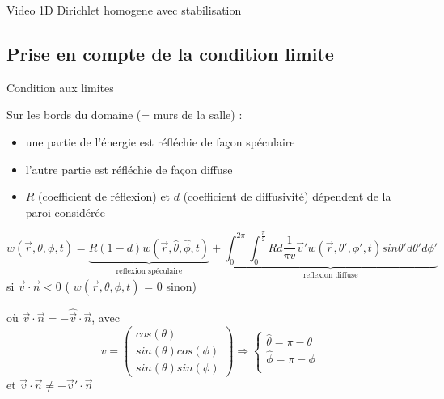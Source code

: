 \begin{frame}
  Video 1D Dirichlet homogene avec stabilisation
\end{frame}

\subsection{Prise en compte de la condition limite}
\begin{frame}{Condition aux limites}

  Sur les bords du domaine (= murs de la salle) :
  \begin{itemize}[label=$\bullet$]
  \item une partie de l'énergie est réfléchie de façon spéculaire %
  \item l'autre partie est réfléchie de façon diffuse %
    \vspace*{0.2cm}
  \item $R$ (coefficient de réflexion) et $d$ (coefficient de diffusivité) dépendent de la paroi considérée
  \end{itemize}

  \vspace*{-0.4cm}
  \begin{small}
    \begin{equation*}
      w(\vec{r},\theta,\phi,t) = \underbrace{R(1-d)w(\vec{r},\hat{\theta},\hat{\phi},t)}_{\text{reflexion spéculaire}}
      + \underbrace{ \int_{0}^{2\pi} \int_{0}^{\frac{\pi}{2}} Rd\frac{1}{\pi v} \vec{v}'w(\vec{r},\theta',\phi',t) sin \theta' d\theta' d\phi'}_{\text{reflexion diffuse}}
    \end{equation*}
    si $\vec{v} \cdot \vec{n} < 0$ ( $w(\vec{r},\theta,\phi,t)$ = 0 sinon) \\
  \end{small}

  où $\vec{v} \cdot \vec{n} = -\hat{\vec{v}} \cdot \vec{n}$, avec
  \begin{equation*}
    v=
    \left(
    \begin{array}{lll}
      cos(\theta)\\
      sin(\theta)cos(\phi)\\
      sin(\theta)sin(\phi)
    \end{array}
    \right)
    \Rightarrow
    \left \{
    \begin{array}{ll}
      \hat{\theta} = \pi - \theta \\
      \hat{\phi} = \pi - \phi \\
    \end{array}
    \right.
  \end{equation*}
  et $\vec{v} \cdot \vec{n} \neq -\vec{v}' \cdot \vec{n}$
\end{frame}


